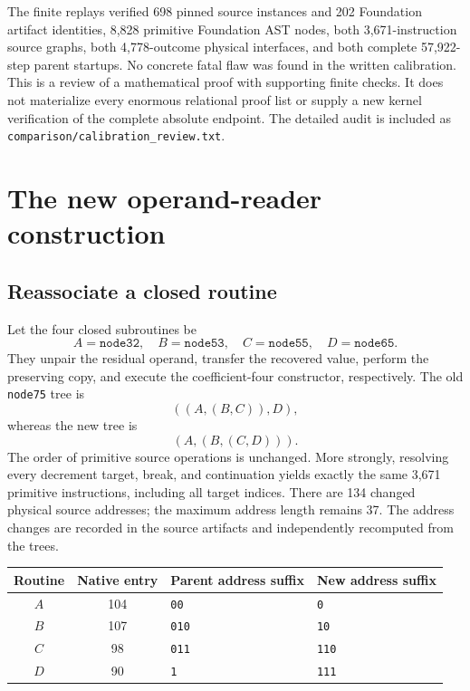 \documentclass[11pt,a4paper]{article}
\theoremstyle{definition}
\newcommand{\file}[1]{\nolinkurl{#1}}
\begin{document}
The finite replays verified 698 pinned source instances and 202
Foundation artifact identities, 8,828 primitive Foundation AST nodes,
both 3,671-instruction source graphs, both 4,778-outcome physical
interfaces, and both complete 57,922-step parent startups. No concrete
fatal flaw was found in the written calibration. This is a review of a
mathematical proof with supporting finite checks. It does not materialize
every enormous relational proof list or supply a new kernel verification
of the complete absolute endpoint. The detailed audit is included as
\file{comparison/calibration_review.txt}.

\section{The new operand-reader construction}
\label{sec:construction}

\subsection{Reassociate a closed routine}
Let the four closed subroutines be
\[
 A=\texttt{node32},\quad B=\texttt{node53},\quad
 C=\texttt{node55},\quad D=\texttt{node65}.
\]
They unpair the residual operand, transfer the recovered value,
perform the preserving copy, and execute the coefficient-four
constructor, respectively. The old \texttt{node75} tree is
\[
       ((A,(B,C)),D),
\]
whereas the new tree is
\[
       (A,(B,(C,D))).
\]
The order of primitive source operations is unchanged. More strongly,
resolving every decrement target, break, and continuation yields exactly
the same 3,671 primitive instructions, including all target indices.
There are 134 changed physical source addresses; the maximum address
length remains 37. The address changes are recorded in the source
artifacts and independently recomputed from the trees.

\begin{center}
\begin{tabular}{ccll}
\toprule
Routine & Native entry & Parent address suffix & New address suffix\\
\midrule
$A$ &104&\texttt{00}&\texttt{0}\\
$B$ &107&\texttt{010}&\texttt{10}\\
$C$ &98&\texttt{011}&\texttt{110}\\
$D$ &90&\texttt{1}&\texttt{111}\\
\bottomrule
\end{tabular}
\end{center}
\end{document}
